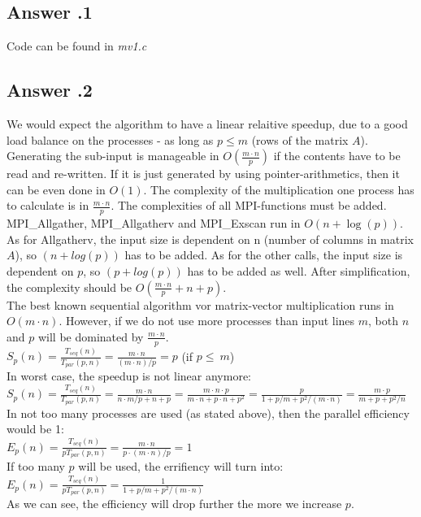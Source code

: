 \documentclass[a4paper,%
11pt,%
DIV=12,
headsepline,%
headings=normal,
]{scrartcl}
\newcounter{curex}
\newcommand{\answer}[1]{\subsection*{Answer \arabic{curex}.#1}}
\begin{document}
\answer{1}
Code can be found in \textit{mv1.c}

\answer{2}
We would expect the algorithm to have a linear relaitive speedup, due to a good load balance on the processes - as long as $p \leq m$  (rows of the matrix $A$). Generating the sub-input is manageable in $O\left(\frac{m \cdot n}{p}\right)$ if the contents have to be read and re-written. If it is just generated by using pointer-arithmetics, then  it can be even done in $O\left(1\right)$. The complexity of the multiplication one process has to calculate is in $\frac{m \cdot n}{p}$. The complexities of all MPI-functions must be added. MPI\_Allgather,  MPI\_Allgatherv and MPI\_Exscan run in $O(n + \log(p))$. As for Allgatherv, the input size is dependent on n (number of columns in matrix $A$), so $(n + log(p))$ has to be added. As for the other calls, the input size is dependent on $p$, so $(p + log(p))$ has to be added as well. After simplification, the complexity should be $O\left(\frac{m \cdot n}{p} + n + p\right)$.\\

\noindent The best known sequential algorithm vor matrix-vector multiplication runs in $O(m \cdot n)$. However, if we do not use more processes than input lines $m$, both $n$ and $p$ will be dominated by $\frac{m \cdot n}{p}$.
\\[0.5 em]
$S_{p}(n)=\frac{T_{seq}(n)}{T_{par}(p,n)} = \frac{m \cdot n}{(m \cdot n)/p } = p$ (if $p \leq\ m$)
\\[0.5 em]
In worst case, the speedup is not linear anymore:
\\[0.5 em]
$\displaystyle S_{p}(n)=\frac{T_{seq}(n)}{T_{par}(p,n)} = \frac{m \cdot n}{n \cdot m/p + n + p} = \frac{m \cdot n \cdot p}{m \cdot n + p \cdot  n + p^2} = \frac{p}{1 + p/m + p^2/(m \cdot n)} = \frac{m \cdot p}{m + p + p^2/n}$
\\[0.5 em]
In not too many processes are used (as stated above), then the parallel efficiency would be 1:
\\[0.5 em]
$\displaystyle E_{p}(n)=\frac{T_{seq}(n)}{pT_{par}(p,n)} = \frac{m \cdot n}{p \cdot (m \cdot n)/p} = 1$
\\[0.5 em]
If too many $p$ will be used, the errifiency will turn into:
\\[0.5 em]
$\displaystyle E_{p}(n)=\frac{T_{seq}(n)}{pT_{par}(p,n)} = \frac{1}{1 + p/m + p^2/(m \cdot n)}$
\\[0.5 em]
As we can see, the efficiency will drop further the more we increase $p$.
\end{document}
